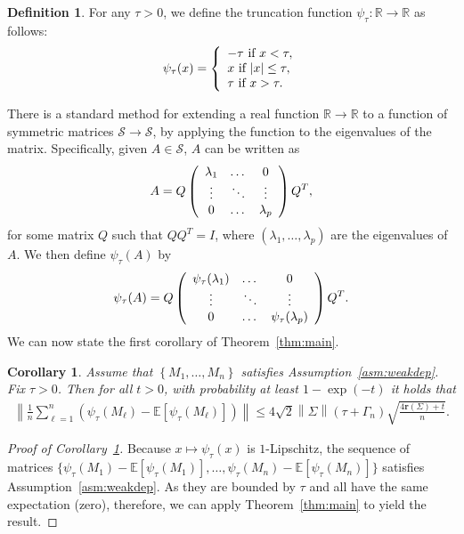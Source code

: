 \documentclass[11pt,a4paper]{article}
\newtheorem{corollary}[theorem]{Corollary}
\theoremstyle{remark}
\theoremstyle{definition}
\newtheorem{definition}{Definition}
\theoremstyle{definition}
\DeclarePairedDelimiter{\abs}{\lvert}{\rvert}
\begin{document}
\begin{bibunit}[apalike]
\begin{definition}
\label{dfn:psi:tau}
For any $\tau>0$, we define the truncation function $\psi_\tau:\mathbb{R}\rightarrow\mathbb{R}$ as follows:
$$ \psi_\tau( x) = \left\{ 
\begin{array}{l}
 -\tau \text{ if } x<\tau, \\
 x \text{ if } {\abs{x}}\leq \tau, \\
 \tau \text{ if } x>\tau. 
\end{array}
\right.
$$
\end{definition}
There is a standard method for extending a real function $\mathbb{R}\rightarrow\mathbb{R}$ to a function of symmetric matrices $\mathcal{S}\rightarrow\mathcal{S}$, by applying the function to the eigenvalues of the matrix. Specifically, given $A\in\mathcal{S}$, $A$ can be written as
$$ A = Q \left(
\begin{array}{c c c}
 \lambda_1 & \dots & 0 \\
 \vdots & \ddots & \vdots \\
 0 & \dots & \lambda_p
\end{array}
\right)  Q^T,
$$
for some matrix $Q$ such that $Q Q^T = I$, where $(\lambda_1,\dots,\lambda_p)$ are the eigenvalues of $A$. We then define $\psi_\tau(A)$ by
$$
\psi_{\tau}(A)
=Q \left(
\begin{array}{c c c}
 \psi_\tau(\lambda_1) & \dots & 0 \\
 \vdots & \ddots & \vdots \\
 0 & \dots & \psi_\tau(\lambda_p)
\end{array}
\right)  Q^T.
$$
We can now state the first corollary of Theorem~\ref{thm:main}.
\begin{corollary}
\label{cor:truncated:1}
Assume that $\left\{M_{1},\ldots,M_{n}\right\}$ satisfies Assumption~\ref{asm:weakdep}. Fix $\tau>0$. Then for all $t>0$, with probability at least $1-\exp(-t)$ it holds that
\begin{align*}
    \left\|\frac{1}{n}\sum_{\ell=1}^{n} ( \psi_\tau(M_{\ell})- \mathbb{E}[\psi_\tau(M_{\ell})] ) \right\|\le{4}\sqrt{2}\left\|\Sigma\right\|\left({\tau+\Gamma_{n}}\right)\sqrt{\frac{4\mathbf{r}\left(\Sigma\right)+t}{n}}  .
\end{align*}
\end{corollary}
\begin{proof}[Proof of Corollary~\ref{cor:truncated:1}]
Because $x\mapsto \psi_\tau(x)$ is $1$-Lipschitz, the sequence of matrices $\{\psi_\tau(M_1)-\mathbb{E}[\psi_\tau(M_1)],\dots,\psi_\tau(M_n) -\mathbb{E}[\psi_\tau(M_n)] \}$ satisfies Assumption~\ref{asm:weakdep}. As they are bounded by $\tau$ and all have the same expectation (zero), therefore, we can apply Theorem~\ref{thm:main} to yield the result.

\end{proof}
\end{bibunit}
\end{document}
